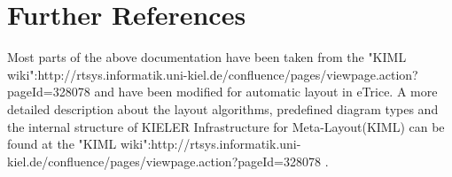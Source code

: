 \section{Further References}

Most parts of the above documentation have been taken from the "KIML 
wiki":http://rtsys.informatik.uni-kiel.de/confluence/pages/viewpage.action?pageId=328078 and have been 
modified for automatic layout in eTrice. A more detailed description about the layout algorithms, 
predefined diagram types and the internal structure of KIELER Infrastructure for Meta-Layout(KIML) can be 
found at the "KIML 
wiki":http://rtsys.informatik.uni-kiel.de/confluence/pages/viewpage.action?pageId=328078 .